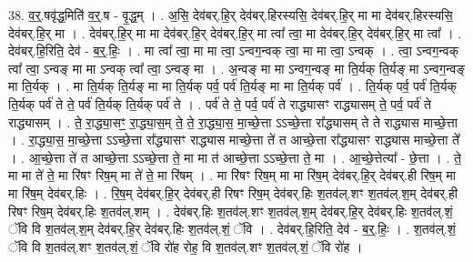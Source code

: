 \documentclass[17pt]{extarticle}
\begin{document}
38. व॒र्॒.षवृ॑द्ध॒मिति॑ व॒र्॒.ष - वृ॒द्ध॒म् । . अ॒सि॒ देव॑बर्.हि॒र् देव॑बर्.हिरस्यसि॒ देव॑बर्.हि॒र् मा मा देव॑बर्.हिरस्यसि॒ देव॑बर्.हि॒र् मा । . देव॑बर्.हि॒र् मा मा देव॑बर्.हि॒र् देव॑बर्.हि॒र् मा त्वा᳚ त्वा॒ मा देव॑बर्.हि॒र् देव॑बर्.हि॒र् मा त्वा᳚ । . देव॑बर्.हि॒रिति॒ देव॑ - ब॒र्॒.हिः॒ । . मा त्वा᳚ त्वा॒ मा मा त्वा॒ ऽन्वग॒न्वक् त्वा॒ मा मा त्वा॒ ऽन्वक् । . त्वा॒ ऽन्वग॒न्वक् त्वा᳚ त्वा॒ ऽन्वङ् मा मा ऽन्वक् त्वा᳚ त्वा॒ ऽन्वङ् मा । . अ॒न्वङ् मा मा ऽन्वग॒न्वङ् मा ति॒र्यक् ति॒र्यङ् मा ऽन्वग॒न्वङ् मा ति॒र्यक् । . मा ति॒र्यक् ति॒र्यङ् मा मा ति॒र्यक् पर्व॒ पर्व॑ ति॒र्यङ् मा मा ति॒र्यक् पर्व॑ । . ति॒र्यक् पर्व॒ पर्व॑ ति॒र्यक् ति॒र्यक् पर्व॑ ते ते॒ पर्व॑ ति॒र्यक् ति॒र्यक् पर्व॑ ते । . पर्व॑ ते ते॒ पर्व॒ पर्व॑ ते राद्ध्यासꣳ राद्ध्यासम् ते॒ पर्व॒ पर्व॑ ते राद्ध्यासम् । . ते॒ रा॒द्ध्या॒सꣳ॒॒ रा॒द्ध्या॒स॒म् ते॒ ते॒ रा॒द्ध्या॒स॒ मा॒च्छे॒त्ता ऽऽच्छे॒त्ता रा᳚द्ध्यासम् ते ते राद्ध्यास माच्छे॒त्ता । . रा॒द्ध्या॒स॒ मा॒च्छे॒त्ता ऽऽच्छे॒त्ता रा᳚द्ध्यासꣳ राद्ध्यास माच्छे॒त्ता ते॑ त आच्छे॒त्ता रा᳚द्ध्यासꣳ राद्ध्यास माच्छे॒त्ता ते᳚ । . आ॒च्छे॒त्ता ते॑ त आच्छे॒त्ता ऽऽच्छे॒त्ता ते॒ मा मा त॑ आच्छे॒त्ता ऽऽच्छे॒त्ता ते॒ मा । . आ॒च्छे॒त्तेत्या᳚ - छे॒त्ता । . ते॒ मा मा ते॑ ते॒ मा रि॑षꣳ रिष॒म् मा ते॑ ते॒ मा रि॑षम् । . मा रि॑षꣳ रिष॒म् मा मा रि॑ष॒म् देव॑बर्.हि॒र् देव॑बर्.ही रिष॒म् मा मा रि॑ष॒म् देव॑बर्.हिः । . रि॒ष॒म् देव॑बर्.हि॒र् देव॑बर्.ही रिषꣳ रिष॒म् देव॑बर्.हिः श॒तव॑ल्.शꣳ श॒तव॑ल्.श॒म् देव॑बर्.ही रिषꣳ रिष॒म् देव॑बर्.हिः श॒तव॑ल्.शम् । . देव॑बर्.हिः श॒तव॑ल्.शꣳ श॒तव॑ल्.श॒म् देव॑बर्.हि॒र् देव॑बर्.हिः श॒तव॑ल्.शं॒ ॅवि वि श॒तव॑ल्.श॒म् देव॑बर्.हि॒र् देव॑बर्.हिः श॒तव॑ल्.शं॒ ॅवि । . देव॑बर्.हि॒रिति॒ देव॑ - ब॒र्॒.हिः॒ । . श॒तव॑ल्.शं॒ ॅवि वि श॒तव॑ल्.शꣳ श॒तव॑ल्.शं॒ ॅवि रो॑ह रोह॒ वि श॒तव॑ल्.शꣳ श॒तव॑ल्.शं॒ ॅवि रो॑ह । \newline
\end{document}
